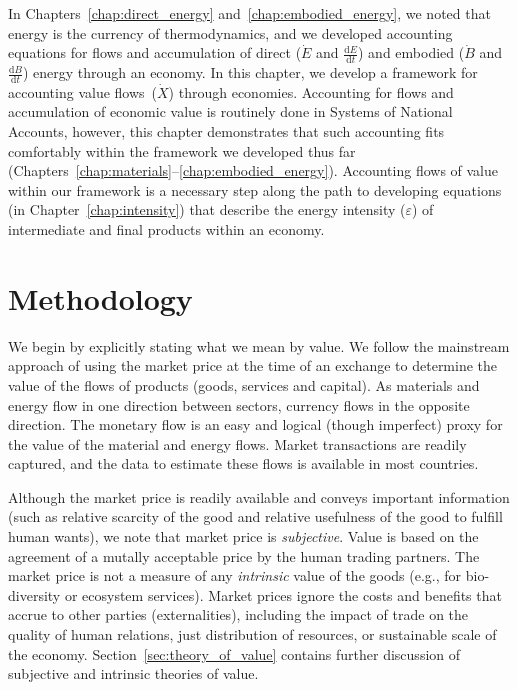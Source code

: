 In Chapters~\ref{chap:direct_energy} and~\ref{chap:embodied_energy}, 
we noted that energy is the currency of thermodynamics,
and we developed accounting equations for flows and accumulation of 
direct ($\dot{E}$ and $\frac{\mathrm{d}E}{\mathrm{d}t}$) 
and embodied ($\dot{B}$ and $\frac{\mathrm{d}B}{\mathrm{d}t}$) 
energy through an economy.
In this chapter, we develop a framework for accounting
value flows~($\dot{X}$) through economies.
Accounting for flows and accumulation of economic value is 
routinely done in Systems of National Accounts,
however, this chapter demonstrates that such accounting
fits comfortably within the framework we developed thus far
(Chapters~\ref{chap:materials}--\ref{chap:embodied_energy}).
Accounting flows of value within our framework is a necessary step along
the path to developing equations (in Chapter~\ref{chap:intensity}) 
that describe the energy intensity ($\varepsilon$) of intermediate
and final products within an economy.


\section{Methodology}
\label{sec:Value_Methodology}

We begin by explicitly stating what we mean by value. 
We follow the mainstream approach 
of using the market price at the time of an exchange
to determine the value of the flows of products (goods, services and capital). 
As materials and energy flow in one direction between sectors, 
currency flows in the opposite direction. 
The monetary flow is an easy and logical (though imperfect)
proxy for the value of the material and energy flows. 
Market transactions are readily captured, 
and the data 
to estimate these flows is available in most countries.\cite{IIOA-Data}

Although the market price is readily available and conveys important information (such as
relative scarcity of the good and relative usefulness of the good to fulfill human wants), we note that market
price is \emph{subjective}.  
Value is based on the agreement of a mutally acceptable price 
by the human trading partners. 
The market price
is not a measure of any \emph{intrinsic}
value of the goods (e.g., for bio-diversity or ecosystem services). 
Market prices ignore the costs and benefits that accrue 
to other parties (externalities), 
including the impact of trade on the quality of human relations, 
just distribution of resources, 
or sustainable scale of the economy.\cite[p.~55]{Daly1997} 
Section~\ref{sec:theory_of_value} 
contains further discussion of subjective and intrinsic theories of value. 

